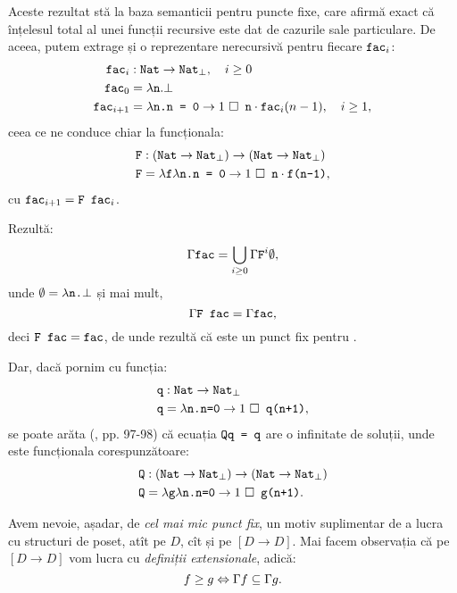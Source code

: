 \documentclass[12pt, a4paper]{article}
\begin{document}
Aceste rezultat stă la baza semanticii pentru puncte fixe, care afirmă exact că
înțelesul total al unei funcții recursive este dat de cazurile sale particulare.
De aceea, putem extrage și o reprezentare nerecursivă pentru fiecare $\texttt{fac}_i $:
\begin{align*}
  \texttt{fac}_i &: \texttt{Nat} \to \texttt{Nat}_\bot, \quad i \geq 0 \\
  \texttt{fac}_0 &= \lambda \texttt{n} . \bot \\
  \texttt{fac}_{i + 1} &= \lambda \texttt{n.n = 0} \to 1\,\, \square \texttt{ n} \cdot \texttt{fac}_i(n-1), \quad i \geq 1,
\end{align*}
ceea ce ne conduce chiar la funcționala:
\begin{align*}
  \texttt{F} &: (\texttt{Nat} \to \texttt{Nat}_\bot) \to (\texttt{Nat} \to \texttt{Nat}_\bot) \\
  \texttt{F} &= \lambda \texttt{f}\lambda \texttt{n.n = 0} \to 1 \,\, \square \texttt{ n} \cdot \texttt{f(n-1)},
\end{align*}
cu $ \texttt{fac}_{i + 1} = \texttt{F fac}_i $.

Rezultă:
\[
  \Gamma \texttt{fac} = \displaystyle\bigcup_{i \geq 0} \Gamma \texttt{F}^i \emptyset,
\]
unde $ \emptyset = \lambda \texttt{n.} \bot $ și mai mult,
\[
  \Gamma \texttt{F fac} = \Gamma \texttt{fac},
\]
deci $ \texttt{F fac} = \texttt{fac} $, de unde rezultă că  este un punct
fix pentru .

Dar, dacă pornim cu funcția:
\begin{align*}
  \texttt{q} &: \texttt{Nat} \to \texttt{Nat}_\bot \\
  \texttt{q} &= \lambda \texttt{n.n=0} \to 1 \,\, \square \texttt{ q(n+1)},
\end{align*}
se poate arăta (\cite{schm}, pp. 97-98) că ecuația $ \texttt{Qq = q} $ are
o infinitate de soluții, unde  este funcționala corespunzătoare:
\begin{align*}
  \texttt{Q} &: (\texttt{Nat} \to \texttt{Nat}_\bot) \to (\texttt{Nat} \to \texttt{Nat}_\bot) \\
  \texttt{Q} &= \lambda \texttt{g} \lambda \texttt{n.n=0} \to 1\,\, \square \texttt{ g(n+1)}.
\end{align*}

Avem nevoie, așadar, de \emph{cel mai mic punct fix}, un motiv suplimentar de a lucra
cu structuri de poset, atît pe $ D $, cît și pe $ [ D \to D ] $. Mai facem observația
că pe $ [D \to D] $ vom lucra cu \emph{definiții extensionale}, adică:
\[
  f \geq g \Leftrightarrow \Gamma f \subseteq \Gamma g.
\]
\end{document}
